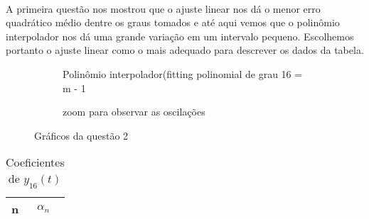 \paragraph{}A primeira questão nos  mostrou que o ajuste linear nos dá
o menor erro quadrático médio dentre os graus tomados e até aqui vemos que
o polinômio interpolador nos dá uma grande variação em um intervalo pequeno.
Escolhemos portanto o ajuste linear como o mais adequado para descrever os dados da tabela.
\FloatBarrier
\begin{figure}[!htp]
	\begin{subfigure}[!htp]{0.5\textwidth}
	
	\caption{Polinômio interpolador(fitting polinomial de grau 16 = m - 1}
	\label{fig:quest2}
	\end{subfigure}

	\begin{subfigure}[!htp]{0.5\textwidth}
	
	\caption{zoom para observar as oscilações}
	\label{fig:quest2-zoom}
	\end{subfigure}
	\caption{Gráficos da questão 2}
\end{figure}
\FloatBarrier




\begin{table}[!htp]
\centering
	\begin{tabular}{|l|l|}\hline
	n & $\alpha_{n}$ \\ \hline
	
	\end{tabular}
	\caption{Coeficientes de $y_{16}(t)$}
	\label{tab:quest2-X16}
\end{table}
